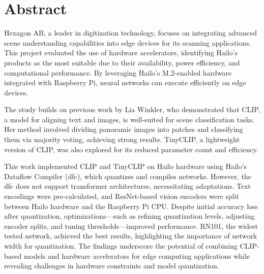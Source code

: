 %
%
%

\chapter*{Abstract}

 Hexagon AB, a leader in digitization technology, focuses on integrating advanced scene understanding capabilities into edge devices for its scanning applications.
 This project evaluated the use of hardware accelerators, identifying Hailo's products as the most suitable due to their availability, power efficiency, and computational performance.
 By leveraging Hailo's M.2-enabled hardware integrated with Raspberry Pi, neural networks can execute efficiently on edge devices.

The study builds on previous work by Lia Winkler, who demonstrated that CLIP, a model for aligning text and images, is well-suited for scene classification tasks.
Her method involved dividing panoramic images into patches and classifying them via majority voting, achieving strong results. TinyCLIP, a lightweight version of CLIP, was also explored for its reduced parameter count and efficiency.
    
This work implemented CLIP and TinyCLIP on Hailo hardware using Hailo’s Dataflow Compiler (\acrfull{dfc}), which quantizes and compiles networks.
However, the \acrshort{dfc} does not support transformer architectures, necessitating adaptations. Text encodings were pre-calculated, and ResNet-based vision encoders were split between Hailo hardware and the Raspberry Pi CPU.
Despite initial accuracy loss after quantization, optimizations—such as refining quantization levels, adjusting encoder splits, and tuning thresholds—improved performance.
RN101, the widest tested network, achieved the best results, highlighting the importance of network width for quantization.
The findings underscore the potential of combining CLIP-based models and hardware accelerators for edge computing applications while revealing challenges in hardware constraints and model quantization. 

	
	
